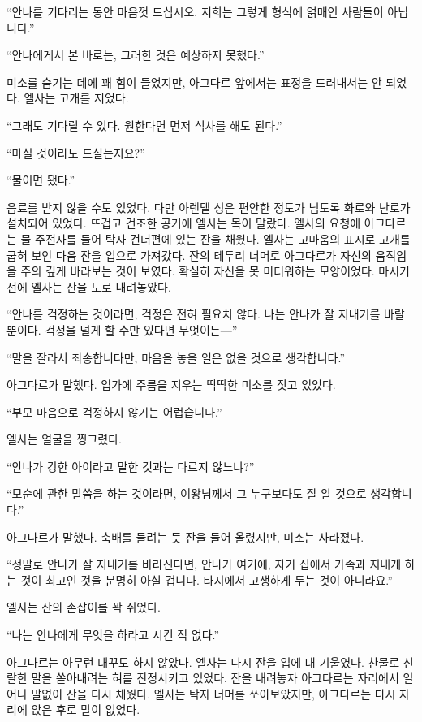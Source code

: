 ``안나를 기다리는 동안 마음껏 드십시오. 저희는 그렇게 형식에 얽매인 사람들이 아닙니다.''

``안나에게서 본 바로는, 그러한 것은 예상하지 못했다.''

미소를 숨기는 데에 꽤 힘이 들었지만, 아그다르 앞에서는 표정을 드러내서는 안 되었다. 엘사는 고개를 저었다.

``그래도 기다릴 수 있다. 원한다면 먼저 식사를 해도 된다.''

``마실 것이라도 드실는지요?''

``물이면 됐다.''

음료를 받지 않을 수도 있었다. 다만 아렌델 성은 편안한 정도가 넘도록 화로와 난로가 설치되어 있었다. 뜨겁고 건조한 공기에 엘사는 목이 말랐다. 엘사의 요청에 아그다르는 물 주전자를 들어 탁자 건너편에 있는 잔을 채웠다. 엘사는 고마움의 표시로 고개를 굽혀 보인 다음 잔을 입으로 가져갔다. 잔의 테두리 너머로 아그다르가 자신의 움직임을 주의 깊게 바라보는 것이 보였다. 확실히 자신을 못 미더워하는 모양이었다. 마시기 전에 엘사는 잔을 도로 내려놓았다.

``안나를 걱정하는 것이라면, 걱정은 전혀 필요치 않다. 나는 안나가 잘 지내기를 바랄 뿐이다. 걱정을 덜게 할 수만 있다면 무엇이든—''

``말을 잘라서 죄송합니다만, 마음을 놓을 일은 없을 것으로 생각합니다.''

아그다르가 말했다. 입가에 주름을 지우는 딱딱한 미소를 짓고 있었다.

``부모 마음으로 걱정하지 않기는 어렵습니다.''

엘사는 얼굴을 찡그렸다.

``안나가 강한 아이라고 말한 것과는 다르지 않느냐?''

``모순에 관한 말씀을 하는 것이라면, 여왕님께서 그 누구보다도 잘 알 것으로 생각합니다.''

아그다르가 말했다. 축배를 들려는 듯 잔을 들어 올렸지만, 미소는 사라졌다.

``정말로 안나가 잘 지내기를 바라신다면, 안나가 여기에, 자기 집에서 가족과 지내게 하는 것이 최고인 것을 분명히 아실 겁니다. 타지에서 고생하게 두는 것이 아니라요.''

엘사는 잔의 손잡이를 꽉 쥐었다.

``나는 안나에게 무엇을 하라고 시킨 적 없다.''

아그다르는 아무런 대꾸도 하지 않았다. 엘사는 다시 잔을 입에 대 기울였다. 찬물로 신랄한 말을 쏟아내려는 혀를 진정시키고 있었다. 잔을 내려놓자 아그다르는 자리에서 일어나 말없이 잔을 다시 채웠다. 엘사는 탁자 너머를 쏘아보았지만, 아그다르는 다시 자리에 앉은 후로 말이 없었다.


